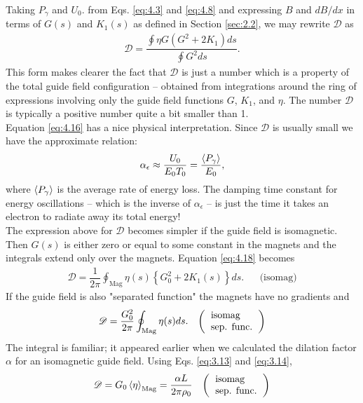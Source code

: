 Taking $P_\gamma$ and $U_0$. from Eqs. \eqref{eq:4.3} and \eqref{eq:4.8} and expressing
 $B$ and $dB/dx$ in terms of $G(s)$ and $K_1(s)$ as defined in Section \ref{sec:2.2}, we may rewrite $\mathscr{D}$ as
\begin{align} \label{eq:4.18}
	\mathscr{D} = \dfrac{\oint \eta G (G^2 + 2K_1)ds}{\oint G^2 ds}.
\end{align}
This form makes clearer the fact that $\mathscr{D}$ is just a number which is a property of
the total guide field configuration -- obtained from integrations around the ring of expressions
 involving only the guide field functions $G$, $K_1$, and $\eta$. The number $\mathscr{D}$ is typically a positive number quite a bit smaller than 1.\\
Equation \eqref{eq:4.16} has a nice physical interpretation. Since $\mathscr{D}$ is usually small
we have the approximate relation:
\begin{align}
	\alpha_\epsilon \approx \dfrac{U_0}{E_0 T_0} = \dfrac{\left< P_\gamma \right>}{E_0},
\end{align}
where $\left< P_\gamma \right>$ is the average rate of energy loss. The damping time constant for energy oscillations -- which is the inverse of $\alpha_\epsilon$ -- is just the time it takes an electron to radiate away its total energy!\\
The expression above for $\mathscr{D}$ becomes simpler if the guide field is isomagnetic. Then $G(s)$ is either zero or equal to some constant in the magnets and the integrals extend only over the magnets. Equation \eqref{eq:4.18} becomes
\begin{align} \label{eq:4.20}
	\mathscr{D} = \dfrac{1}{2\pi}\oint_{\text{Mag}}\eta(s)\left\lbrace G_0^2 + 2K_1(s) \right\rbrace ds. && \text{(isomag)}
\end{align}
If the guide field is also "separated function" the magnets have no gradients and
\begin{align}\label{eq:4.17}
	\mathscr{D} = \dfrac{G_0^2}{2\pi}\oint_{\text{Mag}}\eta(s) ds. && \left(\begin{tabular}{l}
\text{isomag} \\
\text{sep. func.}
\end{tabular}\right)
\end{align}
The integral is familiar; it appeared earlier when we calculated the dilation factor $\alpha$ for an isomagnetic guide field. Using Eqs. \eqref{eq:3.13} and \eqref{eq:3.14},
\begin{align}
	\mathscr{D} = G_0 \mean{\eta}_\text{Mag} = \dfrac{\alpha L}{2 \pi \rho_0} && \left(\begin{tabular}{l}
\text{isomag} \\
\text{sep. func.}
\end{tabular}\right)
\end{align}
